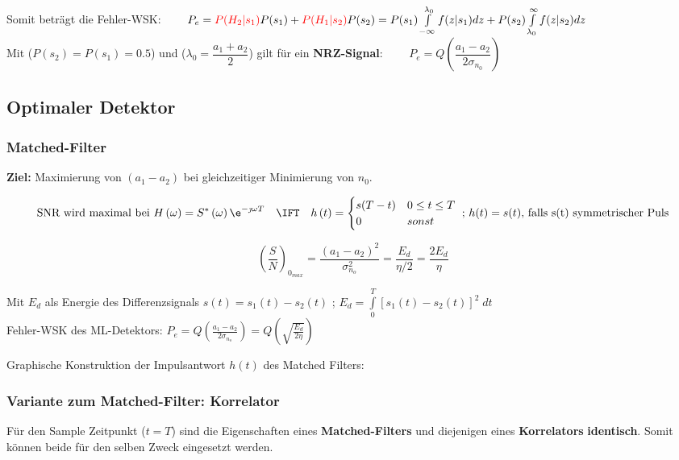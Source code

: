 Somit beträgt die Fehler-WSK: $ \qquad P_e = \textcolor{red}{P(H_2 | s_1)} P(s_1) + \textcolor{red}{P(H_1 | s_2)}P(s_2) = 
 P(s_1) \int\limits_{-\infty}^{\lambda_0} f(z|s_1) dz + P(s_2) \int\limits_{\lambda_0}^{\infty}
 f(z|s_2) dz$ \\
Mit ($P(s_2) = P(s_1) = 0.5$) und ($\lambda_0 = \dfrac{a_1 + a_2}{2}$) gilt für ein
\textbf{NRZ-Signal}: $ \qquad P_e = Q \left(\dfrac{a_1 - a_2}{2 \sigma_{n_0}}\right) $



\subsection{Optimaler Detektor }
\subsubsection{Matched-Filter}
\label{09_matched_filter}
	\textbf{Ziel: } Maximierung von $(a_1 - a_2)$ bei gleichzeitiger Minimierung
	von $n_0$.
 
	$$\text{SNR wird maximal bei } H \left( \omega \right) = S^* \left( \omega
	\right) \e^{-\jmath \omega T} \quad \IFT \quad h \left( t \right) = 
	\begin{cases} s(T-t) & 0 \leq t \leq T \\
	0 & sonst\end{cases}\text{ ; }h(t) = s(t) \text{, falls s(t) symmetrischer Puls}$$
	\begin{minipage}{6cm}{	
		$$ \left(\dfrac{S}{N}\right)_{0_{max}} = \dfrac{(a_1 - a_2)^2}{\sigma_{n_o}^2} = \dfrac{E_d}{\eta / 2} = \dfrac{2E_d}{\eta}$$} 	
	\end{minipage}
	\begin{minipage}{14cm}
		Mit $E_d$ als Energie des Differenzsignals $s(t) = s_1(t) - s_2(t)$ ; $ E_d = \int\limits_{0}^{T}[s_1(t) - s_2(t)]^2 \; dt$ \\
		
		Fehler-WSK des ML-Detektors: $P_e = Q\left(\frac{a_1 - a_2}{2\sigma_{n_o}}\right)  = Q\left(\sqrt{\frac{E_d}{2 \eta}} \right)$
	\end{minipage}
 	
 	Graphische Konstruktion der Impulsantwort $h(t)$ des Matched Filters: 

\subsubsection{Variante zum Matched-Filter: Korrelator} \label{09_korrelator}
Für den Sample Zeitpunkt ($t=T$) sind die Eigenschaften eines \textbf{Matched-Filters} und diejenigen eines
\textbf{Korrelators} \textbf{identisch}. Somit können beide für den selben Zweck eingesetzt werden.

